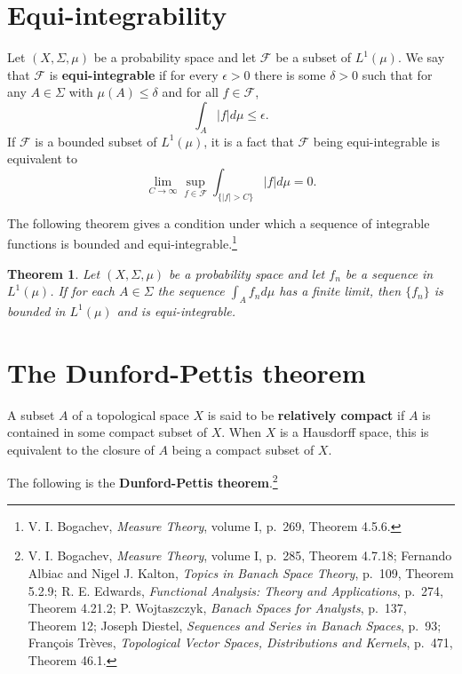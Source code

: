 \documentclass{article}
\newtheorem{theorem}{Theorem}
\theoremstyle{definition}
\begin{document}
\section{Equi-integrability}
Let $(X,\Sigma,\mu)$ be a probability space and let $\mathscr{F}$ be a subset of $L^1(\mu)$. We say that $\mathscr{F}$
is \textbf{equi-integrable} if for every $\epsilon>0$ there is some $\delta>0$ such that for any
$A \in \Sigma$ with $\mu(A) \leq \delta$ and for all $f \in \mathscr{F}$,
\[
\int_A |f| d\mu \leq \epsilon.
\]
If $\mathscr{F}$ is a bounded subset of $L^1(\mu)$, it is a fact that $\mathscr{F}$ being equi-integrable is equivalent to 
\begin{equation}
\lim_{C \to \infty} \sup_{f \in \mathscr{F}} \int_{\{|f|>C\}} |f| d\mu  = 0.
\label{Climit}
\end{equation}

The following theorem gives a condition under which a sequence of integrable functions is bounded and
equi-integrable.\footnote{V. I. Bogachev, {\em Measure Theory}, volume I, p.~269, Theorem 4.5.6.}

\begin{theorem}
Let $(X,\Sigma,\mu)$ be a probability space and let $f_n$ be a sequence in $L^1(\mu)$. If for each $A \in \Sigma$ the
sequence $\int_A f_n d\mu$ has a finite limit, then $\{f_n\}$ is bounded in $L^1(\mu)$ and is equi-integrable.
\label{Alimit}
\end{theorem}


\section{The Dunford-Pettis theorem}
A subset $A$ of a topological space $X$ is said to be \textbf{relatively compact} if $A$ is contained in some compact subset of $X$. When $X$ is a Hausdorff
space, this is equivalent to the closure of $A$ being a compact subset of $X$. 


The following is the \textbf{Dunford-Pettis theorem}.\footnote{V. I. Bogachev, {\em Measure Theory}, volume I,
p.~285, Theorem 4.7.18; Fernando Albiac and
Nigel J. Kalton, {\em Topics in Banach Space Theory}, p.~109, Theorem 5.2.9;
R. E. Edwards, {\em Functional Analysis: Theory and Applications}, p.~274, Theorem 4.21.2;
P. Wojtaszczyk, {\em Banach Spaces for Analysts},
p.~137, Theorem 12; Joseph Diestel, {\em Sequences and Series in Banach Spaces}, p.~93; Fran\c{c}ois Tr\`eves, {\em Topological Vector Spaces, Distributions and Kernels}, p.~471, Theorem 46.1.}
\end{document}
